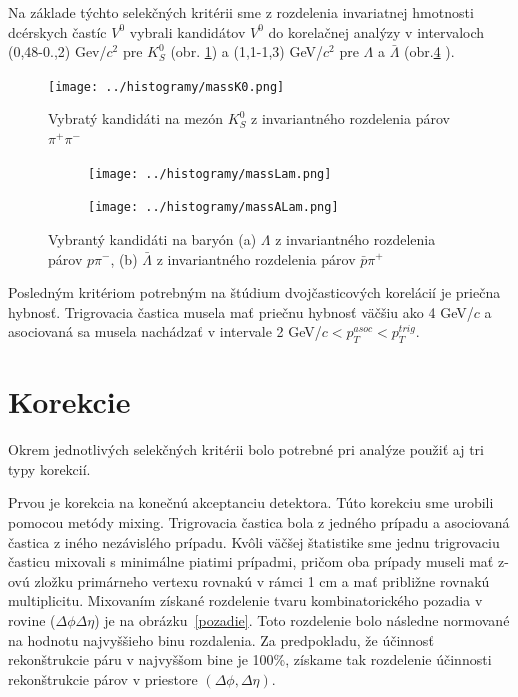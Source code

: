 \documentclass[thesismargins, thesislinespacing]{rnthesis}
\begin{document}
Na základe týchto selekčných kritérii sme z rozdelenia invariatnej hmotnosti dcérskych častíc $V^0$ vybrali kandidátov $V^{0}$ do korelačnej analýzy v intervaloch (0,48-0.,2) Gev/$c^{2}$ pre $K^{0}_{S}$ (obr. \ref{k0}) a (1,1-1,3) GeV/$c^{2}$ pre $\Lambda$ a $\bar{\Lambda}$ (obr.\ref{Lambdy} ). 

\begin{figure}[hbtp!]
	\centering
	\texttt{[image: ../histogramy/massK0.png]}
	\caption{Vybratý kandidáti na mezón $K^0_S$ z invariantného rozdelenia párov $\pi^+\pi^-$}
	\label{k0}
\end{figure}
\begin{figure}
	\centering
	\begin{subfigure}{0.5\textwidth}
		\centering
		\texttt{[image: ../histogramy/massLam.png]}
		\caption{}
		\label{Lam}
	\end{subfigure}%
	\begin{subfigure}{0.5\textwidth}
		\centering
		\texttt{[image: ../histogramy/massALam.png]}
		\caption{}
		\label{ALam}
	\end{subfigure}
	\caption{Vybrantý kandidáti na baryón (a) $\Lambda$ z invariantného rozdelenia párov $p\pi^-$, (b) $\bar{\Lambda}$ z invariantného rozdelenia párov $\bar{p}\pi^+$}
	\label{Lambdy}
\end{figure}

Posledným kritériom potrebným na štúdium dvojčasticových korelácií je priečna hybnosť. Trigrovacia častica musela mať priečnu hybnosť väčšiu ako 4 GeV/$c$ a asociovaná sa musela nachádzať v intervale 2 GeV/$c<p_T^{asoc}<p_T^{trig}$.

\section{Korekcie}
Okrem jednotlivých selekčných kritérii bolo potrebné pri analýze použiť aj tri typy korekcií. 

Prvou je korekcia na konečnú akceptanciu detektora. Túto korekciu sme urobili pomocou metódy mixing. Trigrovacia častica bola z jedného prípadu a asociovaná častica z iného nezávislého prípadu. Kvôli väčšej štatistike sme jednu trigrovaciu časticu mixovali s minimálne piatimi prípadmi, pričom oba prípady museli mať z-ovú zložku primárneho vertexu rovnakú v rámci 1 cm a mať približne rovnakú multiplicitu. Mixovaním získané rozdelenie tvaru kombinatorického pozadia v rovine ($\Delta \phi \Delta \eta$) je na obrázku~\ref{pozadie}. Toto rozdelenie bolo následne normované na hodnotu najvyššieho binu rozdalenia. Za predpokladu, že účinnosť rekonštrukcie páru v najvyššom bine je 100\%, získame tak rozdelenie účinnosti rekonštrukcie párov v priestore $(\Delta \phi,\Delta\eta)$.
\end{document}
